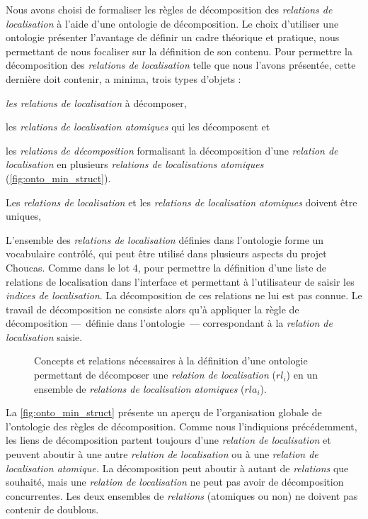 Nous avons choisi de formaliser les règles de décomposition des
\emph{relations de localisation} à l'aide d'une ontologie de
décomposition. Le choix d'utiliser une ontologie présenter l'avantage
de définir un cadre théorique et pratique, nous permettant de nous
focaliser sur la définition de son contenu. Pour permettre la
décomposition des \emph{relations de localisation} telle que nous
l'avons présentée, cette dernière doit contenir, a minima, trois types
d'objets :
%
\begin{enumerate*}[label=(\alph*)]
\item \emph{les relations de localisation} à décomposer,
\item les \emph{relations de localisation atomiques} qui les
  décomposent et
\item les \emph{relations de décomposition} formalisant la
  décomposition d'une \emph{relation de localisation} en plusieurs
  \emph{relations de localisations atomiques}
  (\autoref{fig:onto_min_struct}).
\end{enumerate*}
%
Les \emph{relations de localisation} et les \emph{relations de
  localisation atomiques} doivent être uniques, 

L'ensemble des \emph{relations de localisation} définies dans
l'ontologie forme un vocabulaire contrôlé, qui peut être utilisé dans
plusieurs aspects du projet Choucas. Comme dans le lot 4, pour
permettre la définition d'une liste de relations de localisation dans
l'interface et permettant à l'utilisateur de saisir les \emph{indices
  de localisation}. La décomposition de ces relations ne lui est pas
connue. Le travail de décomposition ne consiste alors qu'à appliquer
la règle de décomposition ---~définie dans l'ontologie~---
correspondant à la \emph{relation de localisation} saisie.

\begin{figure}
  \centering
   
  \caption[Structure générale d'une ontologie de
  décomposition]{Concepts et relations nécessaires à la définition
    d'une ontologie permettant de décomposer une \emph{relation de
      localisation} ($rl_i$) en un ensemble de \emph{relations de
      localisation atomiques} ($rla_i$).}
  \label{fig:onto_min_struct}
\end{figure}


La \autoref{fig:onto_min_struct} présente un aperçu de l'organisation
globale de l'ontologie des règles de décomposition. Comme nous
l'indiquions précédemment, les liens de décomposition partent toujours
d'une \emph{relation de localisation} et peuvent aboutir à une autre
\emph{relation de localisation} ou à une \emph{relation de
  localisation atomique.} La décomposition peut aboutir à autant de
\emph{relations} que souhaité, mais une \emph{relation de
  localisation} ne peut pas avoir de décomposition concurrentes. Les
deux ensembles de \emph{relations} (atomiques ou non) ne doivent pas
contenir de doublous.


